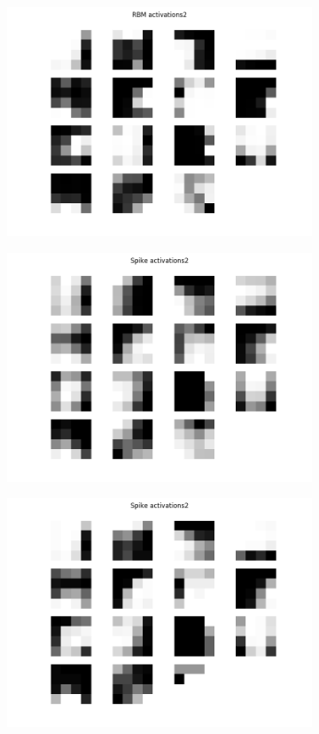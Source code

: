 \begin{figure}
	\begin{subfigure}[t]{.24\textwidth}
  		\centering
  		\includegraphics[width=.9\linewidth]{imgs/convert/rbm00002.png}
  		\label{fig:sub1}
	\end{subfigure}%
	\begin{subfigure}[t]{.24\textwidth}
  		\centering
  		\includegraphics[width=.9\linewidth]{imgs/convert/cnn00002.png}
  		\label{fig:sub2}
	\end{subfigure}
	\begin{subfigure}[t]{.24\textwidth}
  		\centering
  		\includegraphics[width=.9\linewidth]{imgs/convert/coba00002.png}

\end{subfigure}
\end{figure}
